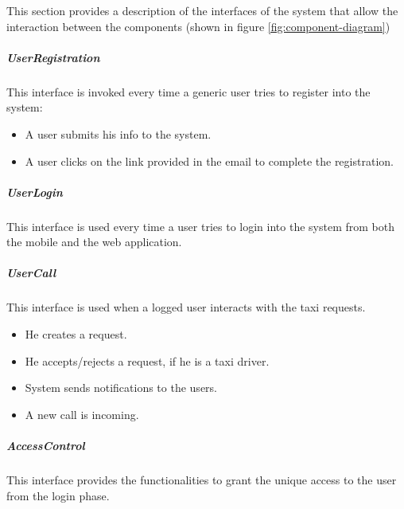 This section provides a description of the interfaces of the system that allow the interaction between the components (shown in figure \ref{fig:component-diagram})

\subparagraph{UserRegistration}
This interface is invoked every time a generic user tries to register into the system:
\begin{itemize}
    \item A user submits his info to the system.
    \item A user clicks on the link provided in the email to complete the registration.
\end{itemize}

\subparagraph{UserLogin}
This interface is used every time a user tries to login into the system from both the mobile and the web application.

\subparagraph{UserCall}
This interface is used when a logged user interacts with the taxi requests.
\begin{itemize}
    \item He creates a request.
    \item He accepts/rejects a request, if he is a taxi driver.
    \item System sends notifications to the users.
    \item A new call is incoming.
\end{itemize}

\subparagraph{AccessControl}
This interface provides the functionalities to grant the unique access to the user from the login phase.